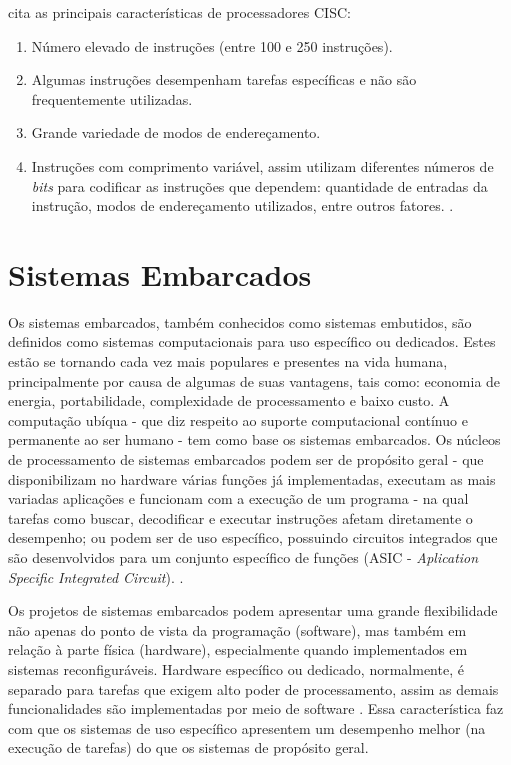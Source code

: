 \citet{mano:1993:computer} cita as principais características de processadores CISC:

\begin{enumerate}
	\item Número elevado de instruções (entre 100 e 250 instruções).
	
	\item Algumas instruções desempenham tarefas específicas e não são frequentemente utilizadas.
	
	\item Grande variedade de modos de endereçamento.
	
	\item Instruções com comprimento variável, assim utilizam diferentes números de \textit{bits} para codificar as instruções que dependem: quantidade de entradas da instrução, modos de endereçamento utilizados, entre outros fatores. \cite{lorenzoni:2012:analise}.
\end{enumerate}		


\section{Sistemas Embarcados}
\label{secao:sistemas_embarcados}

Os sistemas embarcados, também conhecidos como sistemas embutidos, são definidos como sistemas computacionais para uso específico ou dedicados. Estes estão se tornando cada vez mais populares e presentes na vida humana, principalmente por causa de algumas de suas vantagens, tais como: economia de energia, portabilidade, complexidade de processamento e baixo custo. A computação ubíqua - que diz respeito ao suporte computacional contínuo e permanente ao ser humano - tem como base os sistemas embarcados. Os núcleos de processamento de sistemas embarcados podem ser de propósito geral - que disponibilizam no hardware várias funções já implementadas, executam as mais variadas aplicações e funcionam com a execução de um programa - na qual tarefas como buscar, decodificar e executar instruções afetam diretamente o desempenho; ou podem ser de uso específico, possuindo circuitos integrados que são desenvolvidos para um conjunto específico de funções (ASIC - \textit{Aplication Specific Integrated Circuit}). \cite{cruz:2013:desenvolvimento}.

Os projetos de sistemas embarcados podem apresentar uma grande flexibilidade não apenas do ponto de vista da programação (software), mas também em relação à parte física (hardware), especialmente quando implementados em sistemas reconfiguráveis. Hardware específico ou dedicado, normalmente, é separado para tarefas que exigem alto poder de processamento, assim as demais funcionalidades são implementadas por meio de software \cite{wei:2008:research}.
Essa característica faz com que os sistemas de uso específico apresentem um desempenho melhor (na execução de tarefas) do que os sistemas de propósito geral.

